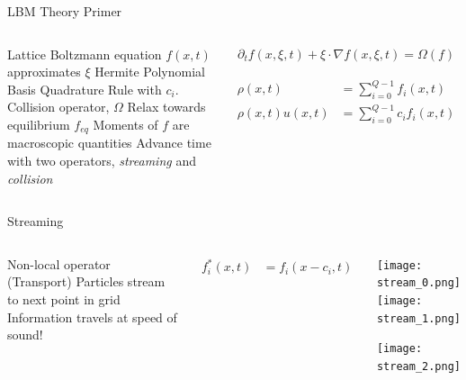 \placelogofalse
\begin{frame}{LBM Theory Primer}
\begin{columns}
\begin{outline}
\1 Lattice Boltzmann equation
\1 $f(x, t)$ approximates $\xi$
\1 Hermite Polynomial Basis \cite{De2019}
\2 Quadrature Rule with $c_i$.
\1 Collision operator, $\Omega$
\2 Relax towards equilibrium $f_{eq}$
\1 Moments of $f$ are macroscopic quantities 
\1 Advance time with two operators, 
\textit{streaming} and \textit{collision}
\end{outline}
\centering
\begin{center}
  \begin{align*}
  \partial_t f(x, \xi, t)  + \xi \cdot \nabla f(x, \xi, t) = \Omega (f)
  \end{align*}

  \begin{align*}
  \rho(x, t) &= \sum_{i = 0}^{Q - 1} f_i(x, t) \\
  \rho(x,t)u(x,t) &= \sum_{i = 0}^{Q - 1}c_i f_i(x, t)
  \end{align*}
\end{center}
\end{columns}
\end{frame}
\placelogotrue

\begin{frame}{Streaming}
\begin{columns}
\begin{outline}
\1 Non-local operator (Transport)
\1 Particles stream to next point in grid 
\1 Information travels at speed of sound!
\end{outline}
\begin{align*}
  f^{*}_i(x, t) &= f_i(x - c_i, t) 
\end{align*}
\centering
  \begin{center}
    \texttt{[image: stream\_0.png]}
    \texttt{[image: stream\_1.png]}

    \texttt{[image: stream\_2.png]}
  \end{center}
\end{columns}
\end{frame}


